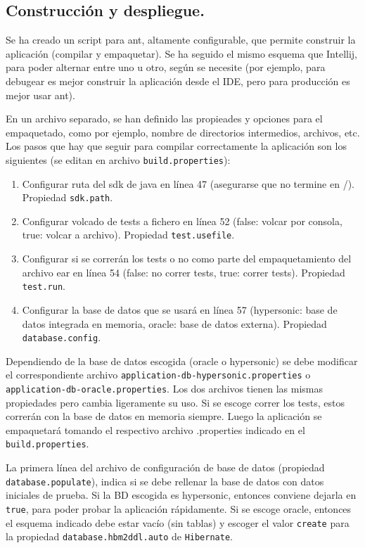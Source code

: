 \documentclass[letter]{article}
\begin{document}
\subsection{Construcción y despliegue.}

Se ha creado un script para ant, altamente configurable, que permite construir la aplicación (compilar y empaquetar). Se ha seguido el mismo esquema que Intellij, para poder alternar entre uno u otro, según se necesite (por ejemplo, para debugear es mejor construir la aplicación desde el IDE, pero para producción es mejor usar ant).

En un archivo separado, se han definido las propieades y opciones para el empaquetado, como por ejemplo, nombre de directorios intermedios, archivos, etc. Los pasos que hay que seguir para compilar correctamente la aplicación son los siguientes (se editan en archivo \texttt{build.properties}):

\begin{enumerate}
\item Configurar ruta del sdk de java en línea 47 (asegurarse que no termine en /). Propiedad \texttt{sdk.path}.
\item Configurar volcado de tests a fichero en línea 52 (false: volcar por consola, true: volcar a archivo). Propiedad \texttt{test.usefile}.
\item Configurar si se correrán los tests o no como parte del empaquetamiento del archivo ear en línea 54 (false: no correr tests, true: correr tests). Propiedad \texttt{test.run}.
\item Configurar la base de datos que se usará en línea 57 (hypersonic: base de datos integrada en memoria, oracle: base de datos externa). Propiedad \texttt{database.config}.
\end{enumerate}

Dependiendo de la base de datos escogida (oracle o hypersonic) se debe modificar el correspondiente archivo \texttt{application-db-hypersonic.properties} o \texttt{application-db-oracle.properties}. Los dos archivos tienen las mismas propiedades pero cambia ligeramente su uso. Si se escoge correr los tests, estos correrán con la base de datos en memoria siempre. Luego la aplicación se empaquetará tomando el respectivo archivo .properties indicado en el \texttt{build.properties}.

La primera línea del archivo de configuración de base de datos (propiedad \texttt{database.populate}), indica si se debe rellenar la base de datos con datos iniciales de prueba. Si la BD escogida es hypersonic, entonces conviene dejarla en \texttt{true}, para poder probar la aplicación rápidamente. Si se escoge oracle, entonces el esquema indicado debe estar vacío (sin tablas) y escoger el valor \texttt{create} para la propiedad \texttt{database.hbm2ddl.auto} de \texttt{Hibernate}.
\end{document}
